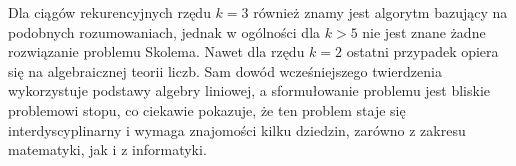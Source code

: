 \documentclass[leqno,10pt]{article}
\begin{document}
Dla ciągów rekurencyjnych rzędu $k=3$ również znamy jest algorytm bazujący na podobnych rozumowaniach, jednak w ogólności dla $k>5$ nie jest znane żadne rozwiązanie problemu Skolema. Nawet dla rzędu $k=2$ ostatni przypadek opiera się na algebraicznej teorii liczb. Sam dowód wcześniejszego twierdzenia wykorzystuje podstawy algebry liniowej, a sformułowanie problemu jest bliskie problemowi stopu, co ciekawie pokazuje, że ten problem staje się interdyscyplinarny i wymaga znajomości kilku dziedzin, zarówno z zakresu matematyki, jak i z informatyki. 
\end{document}
